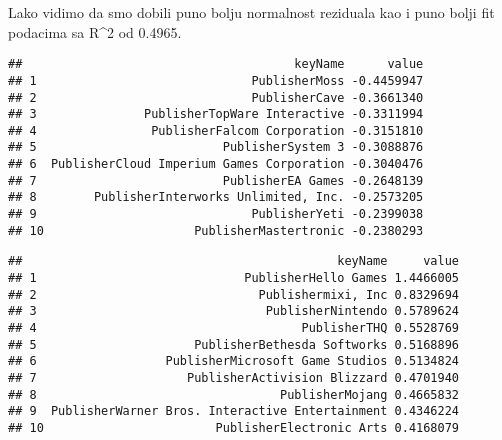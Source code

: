 \documentclass[
]{article}
\newenvironment{Shaded}{\begin{snugshade}}{\end{snugshade}}
\newcommand{\AttributeTok}[1]{\textcolor[rgb]{0.77,0.63,0.00}{#1}}
\newcommand{\CommentTok}[1]{\textcolor[rgb]{0.56,0.35,0.01}{\textit{#1}}}
\newcommand{\ConstantTok}[1]{\textcolor[rgb]{0.00,0.00,0.00}{#1}}
\newcommand{\DecValTok}[1]{\textcolor[rgb]{0.00,0.00,0.81}{#1}}
\newcommand{\FunctionTok}[1]{\textcolor[rgb]{0.00,0.00,0.00}{#1}}
\newcommand{\NormalTok}[1]{#1}
\newcommand{\OtherTok}[1]{\textcolor[rgb]{0.56,0.35,0.01}{#1}}
\newcommand{\SpecialCharTok}[1]{\textcolor[rgb]{0.00,0.00,0.00}{#1}}
\begin{document}
Lako vidimo da smo dobili puno bolju normalnost reziduala kao i puno
bolji fit podacima sa R\^{}2 od 0.4965.

\begin{Shaded}
\end{Shaded}

\begin{verbatim}
##                                      keyName      value
## 1                              PublisherMoss -0.4459947
## 2                              PublisherCave -0.3661340
## 3               PublisherTopWare Interactive -0.3311994
## 4                PublisherFalcom Corporation -0.3151810
## 5                          PublisherSystem 3 -0.3088876
## 6  PublisherCloud Imperium Games Corporation -0.3040476
## 7                          PublisherEA Games -0.2648139
## 8        PublisherInterworks Unlimited, Inc. -0.2573205
## 9                              PublisherYeti -0.2399038
## 10                     PublisherMastertronic -0.2380293
\end{verbatim}

\begin{Shaded}
\end{Shaded}

\begin{verbatim}
##                                            keyName     value
## 1                             PublisherHello Games 1.4466005
## 2                               Publishermixi, Inc 0.8329694
## 3                                PublisherNintendo 0.5789624
## 4                                     PublisherTHQ 0.5528769
## 5                      PublisherBethesda Softworks 0.5168896
## 6                  PublisherMicrosoft Game Studios 0.5134824
## 7                     PublisherActivision Blizzard 0.4701940
## 8                                  PublisherMojang 0.4665832
## 9  PublisherWarner Bros. Interactive Entertainment 0.4346224
## 10                        PublisherElectronic Arts 0.4168079
\end{verbatim}
\end{document}
